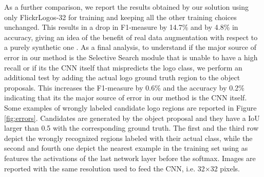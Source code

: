 \documentclass[final,5p,twocolumn]{elsarticle}
\begin{document}
As a further comparison, we report the results obtained by our solution using only FlickrLogos-32 for training and keeping all the other training choices unchanged. This results in a drop in F1-measure by 14.7\% and by 4.8\% in accuracy, giving an idea of the benefit of real data augmentation with respect to a purely synthetic one \cite{eggert2015benefit}.
As a final analysis, to understand if the major source of error in our method is the Selective Search module that is unable to have a high recall or if its the CNN itself that mispredicts the logo class, we perform an additional test by adding the actual logo ground truth region to the object proposals. This increases the F1-measure by 0.6\% and the accuracy by 0.2\% indicating that its the major source of error in our method is the CNN itself. Some examples of wrongly labeled candidate logo regions are reported in Figure \ref{fig:errors}. Candidates are generated by the object proposal and they have a IoU larger than 0.5 with the corresponding ground truth.  The first and the third row depict the wrongly recognized regions labeled with their actual class, while the second and fourth one depict the nearest example in the training set using as features the activations of the last network layer before the softmax. Images are reported with the same resolution used to feed the CNN, i.e. 32$\times$32 pixels.
\end{document}
